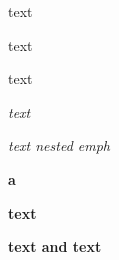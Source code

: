 \documentclass[12pt]{article}
\newcommand\"{quote}
\begin{document}

\inputminted{py}{path/to/file.py}



\textnormal{text}

\textrm{text}

\textsf{text}

\emph{text}

\emph{text \emph{nested} emph}

\textbf{a}

\textbf{text}

\textbf{text \command and text}
\end{document}
